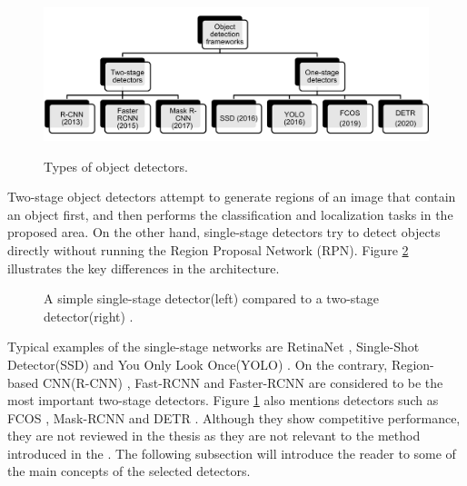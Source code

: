 \begin{figure}[htb]
	\begin{center}
		\includegraphics[width=16cm]{./OD.png}
	\end{center}
	\caption{Types of object detectors.}
	\begin{center}
		\label{OD}
	\end{center}
\end{figure}

Two-stage object detectors attempt to generate regions of an image that contain an object first, and then performs the classification and localization tasks in the proposed area. On the other hand, single-stage detectors try to detect objects directly without running the  Region Proposal Network (RPN). Figure \ref{fig:1vs2stage} illustrates the key differences in the architecture.

\begin{figure}[htb]
    \centering
    \qquad
    \caption{A simple single-stage detector(left) compared to a two-stage detector(right) \cite{app8091488}.}\label{fig:1vs2stage}%
\end{figure}

Typical examples of the single-stage networks are RetinaNet \cite{Lin2017}, Single-Shot Detector(SSD) \cite{Liu2015} and You Only Look Once(YOLO) \cite{Redmon2015a}. On the contrary, Region-based CNN(R-CNN) \cite{Girshick2013}, Fast-RCNN \cite{Girshick2015} and Faster-RCNN \cite{ima} are considered to be the most important two-stage detectors. Figure \ref{OD} also mentions detectors such as FCOS \cite{Tian2019}, Mask-RCNN \cite{He2017} and DETR \cite{Carion2020}. Although they show competitive performance, they are not reviewed in the thesis as they are not relevant to the method introduced in the .  The following subsection will introduce the reader to some of the main concepts of the selected detectors. 

